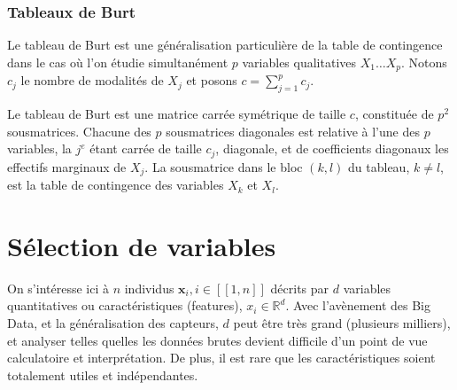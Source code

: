 \documentclass[letterpaper,10pt,french]{sphinxmanual}
\begin{document}
\sphinxAtStartPar
{}


\subsection{Tableaux de Burt}
\label{\detokenize{statsdescriptives:tableaux-de-burt}}
\sphinxAtStartPar
Le tableau de Burt est une généralisation particulière de la table de contingence dans le cas où l’on étudie simultanément \(p\) variables qualitatives \(X_1\ldots X_p\). Notons \(c_j\) le nombre de modalités de \(X_j\) et posons \(c=\displaystyle\sum_{j=1}^p c_j\).

\ignorespaces 
{}\ignorespaces 
\sphinxAtStartPar
Le tableau de Burt est une matrice carrée symétrique de taille \(c\), constituée de \(p^2\) sous\sphinxhyphen{}matrices. Chacune des \(p\) sous\sphinxhyphen{}matrices diagonales est relative à l’une des \(p\) variables, la \(j^e\) étant carrée de taille \(c_j\), diagonale, et de coefficients diagonaux les effectifs marginaux de \(X_j\). La sous\sphinxhyphen{}matrice dans le bloc \((k,l)\) du tableau, \(k\neq l\), est la table de contingence des variables \(X_k\) et \(X_l\).

\sphinxstepscope


\chapter{Sélection de variables}
\label{\detokenize{selection:selection-de-variables}}\label{\detokenize{selection::doc}}
\sphinxAtStartPar
On s’intéresse ici à \(n\) individus  \(\mathbf x_i, i\in[\![1,n]\!]\) décrits par \(d\) variables quantitatives ou caractéristiques (features), \(x_i\in \mathbb{R}^d\). Avec l’avènement des Big Data, et la généralisation des capteurs, \(d\) peut être très grand (plusieurs milliers), et analyser telles quelles les données brutes devient difficile d’un point de vue calculatoire et interprétation. De plus, il est rare que les caractéristiques soient totalement utiles et indépendantes.
\end{document}
